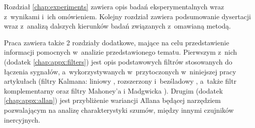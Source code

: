 Rozdział \ref{chap:experiments} zawiera opis badań eksperymentalnych wraz z~wynikami i~ich omówieniem. Kolejny rozdział zawiera podsumowanie dysertacji wraz z~analizą dalszych kierunków badań związanych z~omawianą metodą.

Praca zawiera także 2 rozdziały dodatkowe, mające na celu przedstawienie informacji pomocnych w~analizie przedstawionego tematu. Pierwszym z~nich (dodatek \ref{chap:appx:filters}) jest opis podstawowych filtrów stosowanych do łączenia sygnałów, a~wykorzystywanych w~przytoczonych w~niniejszej pracy artykułach (filtry Kalmana: liniowy \cite{Kalman1960}, rozszerzony \cite{smith1962application} i~bezśladowy \cite{Julier1995}, a~także filtr komplementarny \cite{Euston2008} oraz filtry Mahoney'a \cite{Baldwin2007} i Madgwicka \cite{Madgwick2010}). Drugim (dodatek \ref{chap:appx:allan}) jest przybliżenie wariancji Allana \cite{Allan1966}  będącej narzędziem pozwalającym na analizę charakterystyki szumów, między innymi czujników inercyjnych.